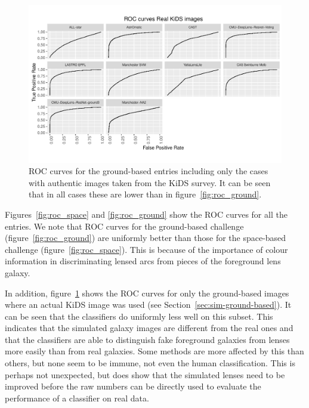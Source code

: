 \documentclass{aa}
\begin{document}
\begin{figure}
 \includegraphics[width=2\columnwidth]{figures/roc_kids.pdf}
 \caption{ROC curves for the ground-based entries including only the cases with authentic images taken from the KiDS survey.  It can be seen that in all cases these are lower than in figure~\ref{fig:roc_ground}.}
 \label{fig:roc_kids}
\end{figure}

Figures~\ref{fig:roc_space} and \ref{fig:roc_ground} show the ROC curves for all the entries.  
We note that ROC curves for the ground-based challenge (figure~\ref{fig:roc_ground}) are uniformly better than those for the space-based challenge (figure~\ref{fig:roc_space}).  This is because of the importance of colour information in discriminating lensed arcs from pieces of the foreground lens galaxy.

In addition, figure~\ref{fig:roc_kids} shows the ROC curves for only the ground-based images where an actual KiDS image was used (see Section~\ref{sec:sim-ground-based}).  It can be seen that the classifiers do uniformly less well on this subset.  This indicates that the simulated galaxy images are different from the real ones and that the classifiers are able to distinguish fake foreground galaxies from lenses more easily than from real galaxies.  Some methods are more affected by this than others, but none seem to be immune, not even the human classification. This is perhaps not unexpected, but does show that the simulated lenses need to be improved before the raw numbers can be directly used to evaluate the performance of a classifier on real data.
\end{document}
